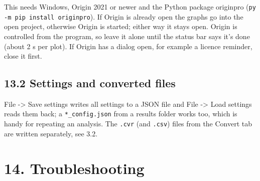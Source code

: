 \documentclass[
  11pt,
  a4paper,
]{article}
\begin{document}
This needs Windows, Origin 2021 or newer and the Python package
originpro (\texttt{py -m pip install originpro}). If Origin is already
open the graphs go into the open project, otherwise Origin is started;
either way it stays open. Origin is controlled from the program, so
leave it alone until the status bar says it's done (about 2 s per plot).
If Origin has a dialog open, for example a licence reminder, close it
first.

\hypertarget{settings-and-converted-files}{%
\subsection{13.2 Settings and converted
files}\label{settings-and-converted-files}}

File -\textgreater{} Save settings writes all settings to a JSON file
and File -\textgreater{} Load settings reads them back; a
\texttt{*\_\allowbreak{}config.json} from a results folder works too,
which is handy for repeating an analysis. The \texttt{.cvr} (and
\texttt{.csv}) files from the Convert tab are written separately, see
3.2.

\hypertarget{troubleshooting}{%
\section{14. Troubleshooting}\label{troubleshooting}}
\end{document}
